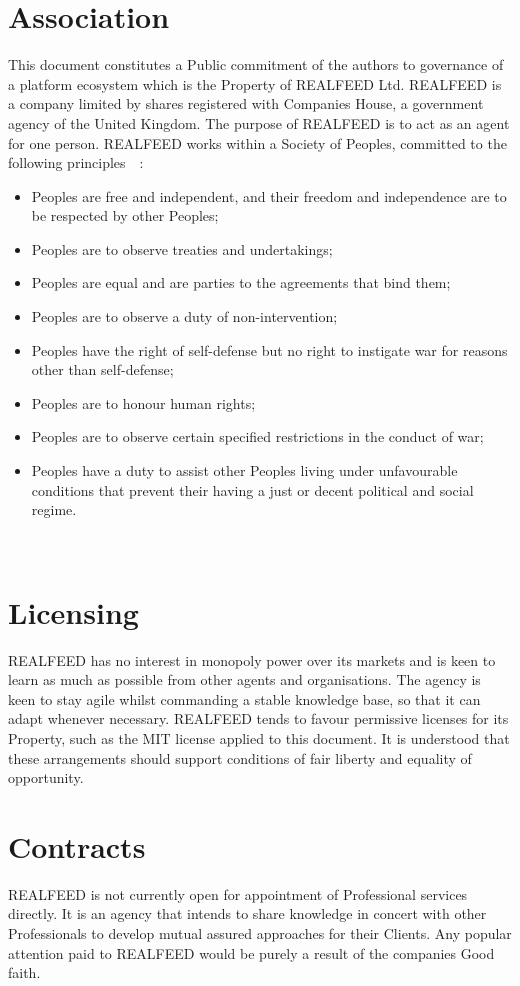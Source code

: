 \documentclass[11pt, oneside]{book}   	%
\begin{document}
\section{Association}
This document constitutes a Public commitment of the authors to governance of a platform ecosystem which is the Property of REALFEED Ltd.
REALFEED is a company limited by shares registered with Companies House, a government agency of the United Kingdom.
The purpose of REALFEED is to act as an agent for one person.
REALFEED works within a Society of Peoples, committed to the following principles~\cite{jlb1}~\cite{tn1}:
\begin{itemize}
	\item Peoples are free and independent, and their freedom and independence are to be respected by other Peoples;
	\item Peoples are to observe treaties and undertakings;
	\item Peoples are equal and are parties to the agreements that bind them;
	\item Peoples are to observe a duty of non-intervention;
	\item Peoples have the right of self-defense but no right to instigate war for reasons other than self-defense;
	\item Peoples are to honour human rights;
	\item Peoples are to observe certain specified restrictions in the conduct of war;
	\item Peoples have a duty to assist other Peoples living under unfavourable conditions that prevent their having a just or decent political and social regime.
\end{itemize}\

\section{Licensing}
REALFEED has no interest in monopoly power over its markets and is keen to learn as much as possible from other agents and organisations.
The agency is keen to stay agile whilst commanding a stable knowledge base, so that it can adapt whenever necessary.
REALFEED tends to favour permissive licenses for its Property, such as the MIT license applied to this document.
It is understood that these arrangements should support conditions of fair liberty and equality of opportunity. 

\section{Contracts}
REALFEED is not currently open for appointment of Professional services directly.
It is an agency that intends to share knowledge in concert with other Professionals to develop mutual assured approaches for their Clients.
Any popular attention paid to REALFEED would be purely a result of the companies Good faith.
\end{document}
